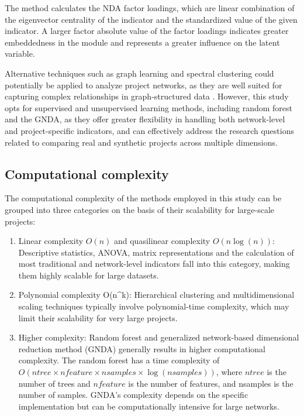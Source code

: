 \documentclass[preprint,
3p]{elsarticle} %
\begin{document}
The method calculates the NDA factor loadings, which are linear
combination of the eigenvector centrality of the indicator and the
standardized value of the given indicator. A larger factor absolute
value of the factor loadings indicates greater embeddedness in the
module and represents a greater influence on the latent variable.

Alternative techniques such as graph learning and spectral clustering
could potentially be applied to analyze project networks, as they are
well suited for capturing complex relationships in graph-structured data
\citep{berahmand2025comprehensive}. However, this study opts for
supervised and unsupervised learning methods, including random forest
and the GNDA, as they offer greater flexibility in handling both
network-level and project-specific indicators, and can effectively
address the research questions related to comparing real and synthetic
projects across multiple dimensions.

\subsection{Computational complexity}\label{sec:comcomplex}

The computational complexity of the methods employed in this study can
be grouped into three categories on the basis of their scalability for
large-scale projects:

\begin{enumerate}
\def\labelenumi{\arabic{enumi}.}
\item
  Linear complexity \(O(n)\) and quasilinear complexity \(O(n\log(n))\):
  Descriptive statistics, ANOVA, matrix representations and the
  calculation of most traditional and network-level indicators fall into
  this category, making them highly scalable for large datasets.
\item
  Polynomial complexity O(n\^{}k): Hierarchical clustering and
  multidimensional scaling techniques typically involve polynomial-time
  complexity, which may limit their scalability for very large projects.
\item
  Higher complexity: Random forest and generalized network-based
  dimensional reduction method (GNDA) generally results in higher
  computational complexity. The random forest has a time complexity of
  \(O(ntree \times nfeature \times nsamples \times \log(nsamples))\),
  where \(ntree\) is the number of trees and \(nfeature\) is the number
  of features, and nsamples is the number of samples. GNDA's complexity
  depends on the specific implementation but can be computationally
  intensive for large networks.
\end{enumerate}
\end{document}

